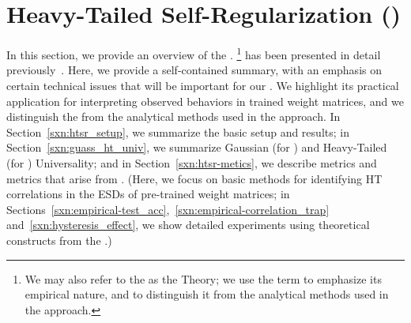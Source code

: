 \section{Heavy-Tailed Self-Regularization (\HTSR)}
\label{sxn:htsr}

In this section, we provide an overview of the \HTSR \Phenomenology.%
\footnote{We may also refer to the \HTSR \Phenomenology as the \HTSR Theory; we use the term \Phenomenology to emphasize its empirical nature, and to distinguish it from the analytical methods used in the \SETOL approach.}
\HTSR has been presented in detail previously~\cite{MM19_HTSR_ICML,MM20_SDM,MM18_TR_JMLRversion}.%
Here, we provide a self-contained summary, with an emphasis on certain technical issues that will be important for our
\SETOL. We highlight its practical application for interpreting observed behaviors in trained weight matrices, and 
we distinguish the \HTSR \Phenomenology from the analytical methods used in the \SETOL approach.
In Section~\ref{sxn:htsr_setup}, we summarize the basic \HTSR setup and results;
in Section~\ref{sxn:guass_ht_univ}, we summarize Gaussian (for \RMT) and Heavy-Tailed (for \HTRMT) Universality; and
in Section~\ref{sxn:htsr-metics}, we describe \SHAPE metrics and \SCALE metrics that arise from \HTSR.
(Here, we focus on basic methods for identifying HT correlations in the ESDs of pre-trained weight matrices; 
in Sections~\ref{sxn:empirical-test_acc},~\ref{sxn:empirical-correlation_trap} and~\ref{sxn:hysteresis_effect}, we show detailed experiments using theoretical constructs from the \HTSR \Phenomenology.)





